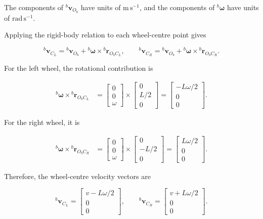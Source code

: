 \documentclass[
  australian,
  12pt,
  letterpaper,
  DIV=11,
  numbers=noendperiod,
  twoside]{scrreprt}
\begin{document}
The components of \({}^{b}\mathbf v_{O_b}\) have units of
\(\mathrm{m\,s^{-1}}\), and the components of
\({}^{b}\boldsymbol{\omega}\) have units of \(\mathrm{rad\,s^{-1}}\).

Applying the rigid-body relation to each wheel-centre point gives

\[
{}^{b}\mathbf v_{C_L}
=
{}^{b}\mathbf v_{O_b}
+
{}^{b}\boldsymbol{\omega}\times{}^{b}\mathbf r_{O_bC_L},
\qquad
{}^{b}\mathbf v_{C_R}
=
{}^{b}\mathbf v_{O_b}
+
{}^{b}\boldsymbol{\omega}\times{}^{b}\mathbf r_{O_bC_R}.
\]

For the left wheel, the rotational contribution is

\[
\begin{aligned}
{}^{b}\boldsymbol{\omega}\times{}^{b}\mathbf r_{O_bC_L}
&=
\begin{bmatrix}0\\0\\\omega\end{bmatrix}
\times
\begin{bmatrix}0\\L/2\\0\end{bmatrix}
=
\begin{bmatrix}-L\omega/2\\0\\0\end{bmatrix}.
\end{aligned}
\]

For the right wheel, it is

\[
\begin{aligned}
{}^{b}\boldsymbol{\omega}\times{}^{b}\mathbf r_{O_bC_R}
&=
\begin{bmatrix}0\\0\\\omega\end{bmatrix}
\times
\begin{bmatrix}0\\-L/2\\0\end{bmatrix}
=
\begin{bmatrix}L\omega/2\\0\\0\end{bmatrix}.
\end{aligned}
\]

Therefore, the wheel-centre velocity vectors are

\[
{}^{b}\mathbf v_{C_L}
=
\begin{bmatrix}v-L\omega/2\\0\\0\end{bmatrix},
\qquad
{}^{b}\mathbf v_{C_R}
=
\begin{bmatrix}v+L\omega/2\\0\\0\end{bmatrix}.
\]
\end{document}
